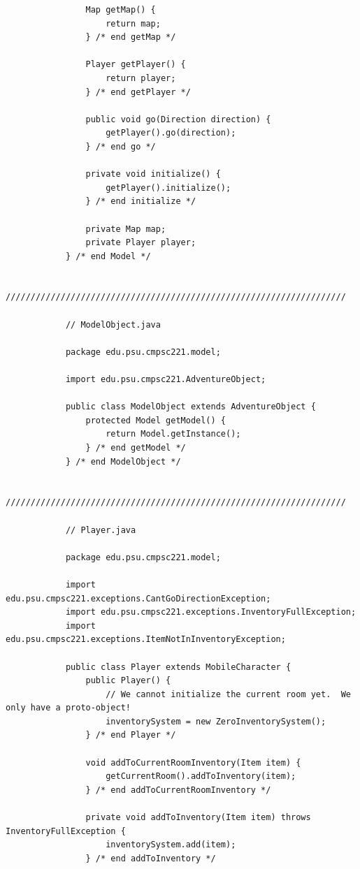 \documentclass[a4paper, 11pt]{article}
\begin{document}
\begin{lstlisting}
                Map getMap() {
                    return map;
                } /* end getMap */

                Player getPlayer() {
                    return player;
                } /* end getPlayer */

                public void go(Direction direction) {
                    getPlayer().go(direction);
                } /* end go */

                private void initialize() {
                    getPlayer().initialize();
                } /* end initialize */

                private Map map;
                private Player player;
            } /* end Model */

            ////////////////////////////////////////////////////////////////////

            // ModelObject.java

            package edu.psu.cmpsc221.model;

            import edu.psu.cmpsc221.AdventureObject;

            public class ModelObject extends AdventureObject {
                protected Model getModel() {
                    return Model.getInstance();
                } /* end getModel */
            } /* end ModelObject */

            ////////////////////////////////////////////////////////////////////

            // Player.java

            package edu.psu.cmpsc221.model;

            import edu.psu.cmpsc221.exceptions.CantGoDirectionException;
            import edu.psu.cmpsc221.exceptions.InventoryFullException;
            import edu.psu.cmpsc221.exceptions.ItemNotInInventoryException;

            public class Player extends MobileCharacter {
                public Player() {
                    // We cannot initialize the current room yet.  We only have a proto-object!
                    inventorySystem = new ZeroInventorySystem();
                } /* end Player */

                void addToCurrentRoomInventory(Item item) {
                    getCurrentRoom().addToInventory(item);
                } /* end addToCurrentRoomInventory */

                private void addToInventory(Item item) throws InventoryFullException {
                    inventorySystem.add(item);
                } /* end addToInventory */


\end{lstlisting}
\end{document}
